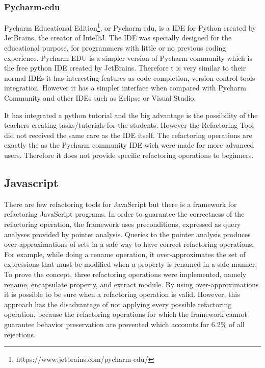 \subsubsection{Pycharm-edu} %
Pycharm Educational Edition\footnote{https://www.jetbrains.com/pycharm-edu/},
 or Pycharm edu, is a IDE for Python created by JetBrains,
the creator of IntelliJ.
The IDE was specially designed for the educational purpose, for programmers
with little or no previous coding experience.
Pycharm EDU is a simpler version of Pycharm community which is the free
python IDE created by JetBrains.
Therefore t is very similar to their normal IDEs it has interesting features
as code completion, version control tools integration.
However it has a simpler interface when compared with
Pycharm Community and other IDEs such as Eclipse or Visual Studio. %

It has integrated a python tutorial and the big advantage is the possibility of
the teachers creating tasks/tutorials for the students.
However the Refactoring Tool did not received the same care as the IDE itself.
The refactoring operations are exactly the as the Pycharm community IDE wich were made
for more advanced users.
Therefore it does not provide specific refactoring operations to beginners.

\subsection{Javascript}
There are few refactoring tools for JavaScript but there is a framework
\cite{feldthaus2011tool} for refactoring JavaScript programs. %
In order to guarantee the correctness of the refactoring operation, the framework
uses preconditions, expressed as query analyses provided by pointer analysis. %
Queries to the pointer analysis produces over-approximations of sets in a safe way to
have correct refactoring operations.
For example, while doing a rename operation, it over-approximates the set of expressions
that must be modified when a property is renamed in a safe manner.
To prove the concept, three refactoring operations were implemented, namely rename,
encapsulate property, and extract module.
By using over-approximations it is possible to be sure when a refactoring
operation is valid.
However, this approach has the disadvantage of not applying every possible refactoring operation,
because the refactoring operations for which the framework cannot guarantee behavior
preservation are prevented which accounts for 6.2\% of all rejections.

